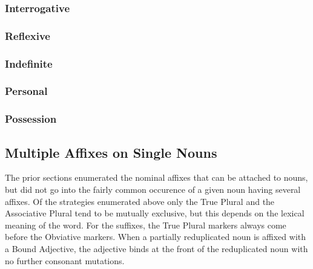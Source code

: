    \subsubsection{Interrogative}
    \subsubsection{Reflexive}
    \subsubsection{Indefinite}
    \subsubsection{Personal}
    \subsubsection{Possession}
    


  \subsection{Multiple Affixes on Single Nouns}
  The prior sections enumerated the nominal affixes that can be attached to nouns, but did not go into the fairly common occurence of a given noun having several affixes. Of the strategies enumerated above only the True Plural and the Associative Plural tend to be mutually exclusive, but this depends on the lexical meaning of the word. For the suffixes, the True Plural markers always come before the Obviative markers. When a partially reduplicated noun is affixed with a Bound Adjective, the adjective binds at the front of the reduplicated noun with no further consonant mutations.
